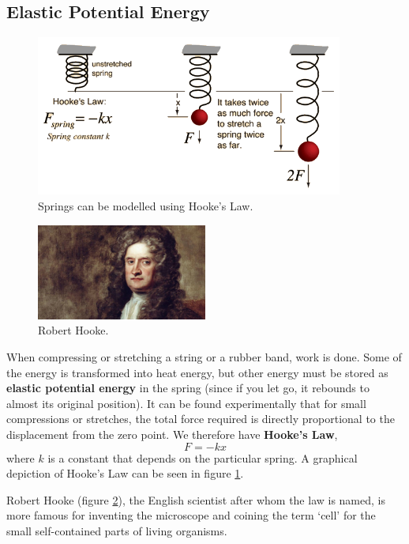 \documentclass[a4paper]{amsbook}
\newcommand\capcite[1]{}
\begin{document}
\subsection{Elastic Potential Energy}
\begin{figure}
  \centering
  \includegraphics[width=0.9\textwidth]{hooke}
  \caption{Springs can be modelled using Hooke's Law. \capcite{http://hyperphysics.phy-astr.gsu.edu/hbase/imgmec/hook.gif}\label{fig:hookeslaw}}
\end{figure}
\begin{figure}
  \centering
  \includegraphics[width=0.5\textwidth]{hookeman}
  \caption{Robert Hooke. \capcite{https://i.vimeocdn.com/video/496483451_1280x720.jpg}\label{fig:hooke}}
\end{figure}
When compressing or stretching a string or a rubber band, work is done. Some of the energy is transformed into
heat energy, but other energy must be stored as \textbf{elastic potential energy} in the spring (since if you let go,
it rebounds to almost its original position). It can be found experimentally that for small compressions or stretches,
the total force required is directly proportional to the displacement from the zero point. We therefore have \textbf{Hooke's Law},
\begin{equation}
  F = -kx
\end{equation}
where $ k $ is a constant that depends on the particular spring. A graphical depiction of Hooke's Law can be seen in figure \ref{fig:hookeslaw}.

Robert Hooke (figure \ref{fig:hooke}), the English scientist after whom the law is named, is more famous for inventing the microscope and coining the term `cell'
for the small self-contained parts of living organisms.
\end{document}
